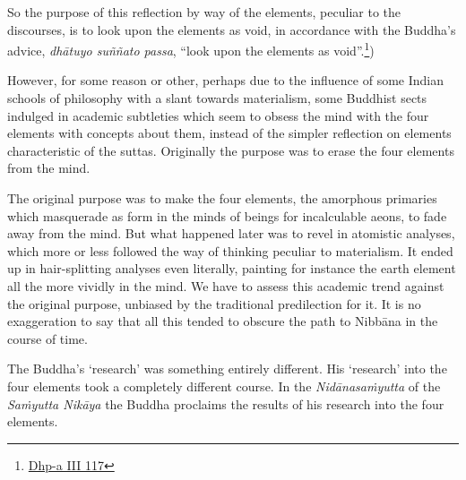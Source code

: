 So the purpose of this reflection by way of the elements, peculiar to the discourses, is to look upon the elements as void, in accordance with the Buddha's advice, \emph{dhātuyo suññato passa}, ``look upon the elements as void''.\footnote{\href{https://www.digitalpalireader.online/_dprhtml/index.html?loc=k.1.0.1.2.4.0.a\&para=9}{Dhp-a III 117}})

However, for some reason or other, perhaps due to the influence of some Indian schools of philosophy with a slant towards materialism, some Buddhist sects indulged in academic subtleties which seem to obsess the mind with the four elements with concepts about them, instead of the simpler reflection on elements characteristic of the suttas. Originally the purpose was to erase the four elements from the mind.

The original purpose was to make the four elements, the amorphous primaries which masquerade as form in the minds of beings for incalculable aeons, to fade away from the mind. But what happened later was to revel in atomistic analyses, which more or less followed the way of thinking peculiar to materialism. It ended up in hair-splitting analyses even literally, painting for instance the earth element all the more vividly in the mind. We have to assess this academic trend against the original purpose, unbiased by the traditional predilection for it. It is no exaggeration to say that all this tended to obscure the path to Nibbāna in the course of time.

The Buddha's `research' was something entirely different. His `research' into the four elements took a completely different course. In the \emph{Nidānasaṁyutta} of the \emph{Saṁyutta Nikāya} the Buddha proclaims the results of his research into the four elements.

